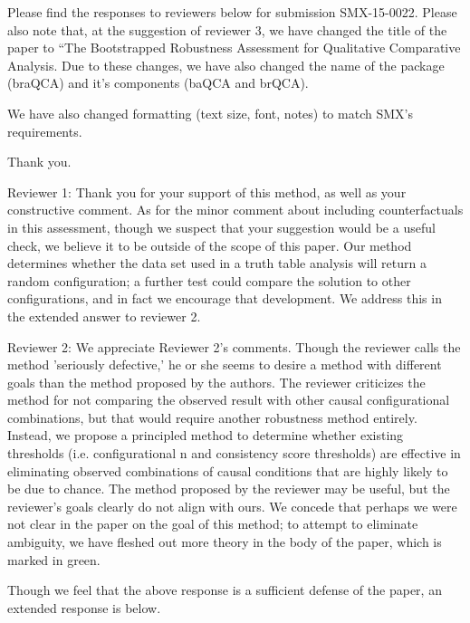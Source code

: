 \documentclass[12pt,stdletter,dateno,sigleft]{newlfm} %
\begin{document}
\begin{newlfm}


Please find the responses to reviewers below for submission SMX-15-0022. Please also note that, at the suggestion of reviewer 3, we have changed the title of the paper to ``The Bootstrapped Robustness Assessment for Qualitative Comparative Analysis. Due to these changes, we have also changed the name of the package (braQCA) and it's components (baQCA and brQCA).

We have also changed formatting (text size, font, notes) to match SMX's requirements. 

Thank you. 

Reviewer 1: Thank you for your support of this method, as well as your constructive comment. As for the minor comment about including counterfactuals in this assessment, though we suspect that your suggestion would be a useful check, we believe it to be outside of the scope of this paper. Our method determines whether the data set used in a truth table analysis will return a random configuration; a further test could compare the solution to other configurations, and in fact we encourage that development. We address this in the extended answer to reviewer 2. 

Reviewer 2: We appreciate Reviewer 2's comments. Though the reviewer calls the method 'seriously defective,' he or she seems to desire a method with different goals than the method proposed by the authors. The reviewer criticizes the method for not comparing the observed result with other causal configurational combinations, but that would require another robustness method entirely. Instead, we propose a principled method to determine whether existing thresholds (i.e. configurational n and consistency score thresholds) are effective in eliminating observed combinations of causal conditions that are highly likely to be due to chance. The method proposed by the reviewer may be useful, but the reviewer's goals clearly do not align with ours. We concede that perhaps we were not clear in the paper on the goal of this method; to attempt to eliminate ambiguity, we have fleshed out more theory in the body of the paper, which is marked in green. 

Though we feel that the above response is a sufficient defense of the paper, an extended response is below. 


\end{newlfm}
\end{document}
